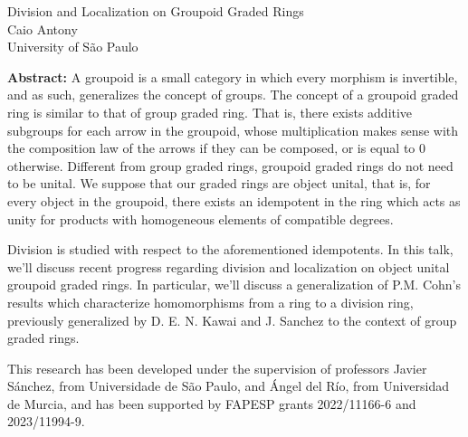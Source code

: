 \documentclass[12pt,a4paper]{article}
\begin{document}
\thispagestyle{empty} 
\begin{center}
{\large  Division and Localization on Groupoid Graded Rings}\\
\vspace*{.5cm}
Caio Antony\\
University of São Paulo\\
\end{center}
\vspace*{.8cm}

{\bf Abstract:} A groupoid is a small category in which every morphism is invertible, and as such, generalizes the concept of groups. The concept of a groupoid graded ring is similar to that of group graded ring. That is, there exists additive subgroups for each arrow in the groupoid, whose multiplication makes sense with the composition law of the arrows if they can be composed, or is equal to 0 otherwise. Different from group graded rings, groupoid graded rings do not need to be unital. We suppose that our graded rings are object unital, that is, for every object in the groupoid, there exists an idempotent in the ring which acts as unity for products with homogeneous elements of compatible degrees.

Division is studied with respect to the aforementioned idempotents. In this talk, we'll discuss recent progress regarding division and localization on object unital groupoid graded rings. In particular, we'll discuss a generalization of P.M. Cohn's results which characterize homomorphisms from a ring to a division ring, previously generalized by D. E. N. Kawai and J. Sanchez to the context of group graded rings.

This research has been developed under the supervision of professors Javier Sánchez, from Universidade de São Paulo, and Ángel del Río, from Universidad de Murcia, and has been supported by FAPESP grants 2022/11166-6 and 2023/11994-9.
\end{document}
